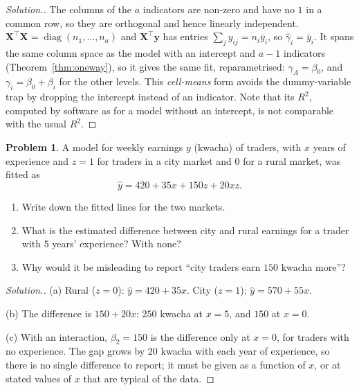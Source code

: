 \documentclass[11pt,a4paper]{article}
\numberwithin{equation}{section}
\theoremstyle{definition}
\newtheorem{problemx}{Problem}[subsection]
\newenvironment{problem}{\begin{problemx}}{\end{problemx}}
\newenvironment{solution}
  {\renewcommand{\qedsymbol}{}\begin{proof}[\textit{Solution}.]}
  {\end{proof}}
\begin{document}
\begin{solution}
The columns of the $a$ indicators are non-zero and have no $1$ in a common row, so they are orthogonal and
hence linearly independent. $\mathbf{X}^\top\mathbf{X} = \operatorname{diag}(n_1, \dots, n_a)$ and $\mathbf{X}^\top\mathbf{y}$ has entries
$\sum_j y_{ij} = n_i\bar y_i$, so $\hat\gamma_i = \bar y_i$. It spans the same column space as the model with an
intercept and $a - 1$ indicators (Theorem~\ref{thm:oneway}), so it gives the same fit, reparametrised:
$\gamma_A = \beta_0$, and $\gamma_i = \beta_0 + \beta_i$ for the other levels. This \emph{cell-means} form avoids the dummy-variable
trap by dropping the intercept instead of an indicator. Note that its $R^2$, computed by software as for a model
without an intercept, is not comparable with the usual $R^2$.
\end{solution}

\begin{problem}\label{prob:interaction-read}
A model for weekly earnings $y$ (kwacha) of traders, with $x$ years of experience and $z = 1$ for traders in a
city market and $0$ for a rural market, was fitted as
\[
\hat y = 420 + 35x + 150z + 20xz .
\]
\begin{enumerate}[label=(\alph*)]
\item Write down the fitted lines for the two markets.
\item What is the estimated difference between city and rural earnings for a trader with $5$ years'
experience? With none?
\item Why would it be misleading to report ``city traders earn $150$ kwacha more''?
\end{enumerate}
\end{problem}

\begin{solution}
(a) Rural ($z = 0$): $\hat y = 420 + 35x$. City ($z = 1$): $\hat y = 570 + 55x$.

(b) The difference is $150 + 20x$: $250$ kwacha at $x = 5$, and $150$ at $x = 0$.

(c) With an interaction, $\beta_2 = 150$ is the difference only at $x = 0$, for traders with no experience. The gap
grows by $20$ kwacha with each year of experience, so there is no single difference to report; it must be
given as a function of $x$, or at stated values of $x$ that are typical of the data.
\end{solution}
\end{document}
